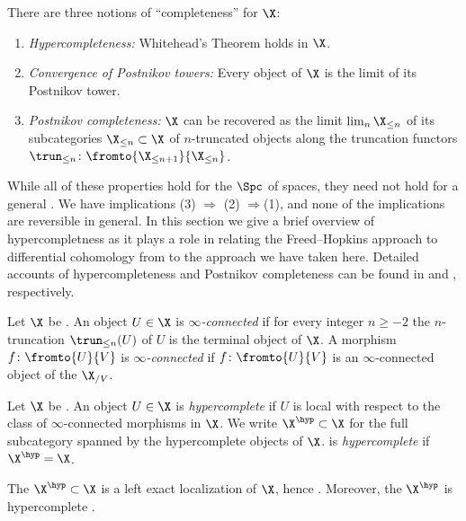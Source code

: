 There are three notions of ``completeness'' for \atopos $ \X $:
\begin{enumerate}[(1)]
	\item \textit{Hypercompleteness:} Whitehead's Theorem holds in $ \X $.

	\item \textit{Convergence of Postnikov towers:} Every object of $ \X $ is the limit of its Postnikov tower.

	\item \textit{Postnikov completeness:} $ \X $ can be recovered as the limit $ \lim_{n} \X_{\leq n} $ of its subcategories $ \X_{\leq n} \subset \X $ of $ n $-truncated objects along the truncation functors $ \trun_{\leq n} \colon \fromto{\X_{\leq n+1}}{\X_{\leq n}} $.
\end{enumerate}
While all of these properties hold for the \topos $ \Spc $ of spaces, they need not hold for a general \topos.
We have implications (3) $ \Rightarrow $ (2) $ \Rightarrow $(1), and none of the implications are reversible in general.
In this section we give a brief overview of hypercompletness as it plays a role in relating the Freed--Hopkins approach to differential cohomology from \cite{MR3049871} to the \categorical approach we have taken here.
Detailed accounts of hypercompleteness and Postnikov completeness can be found in \cite[]{HTT} and \cite[]{SAG}, respectively.

\begin{definition}
	Let $ \X $ be \atopos.
	An object $ U \in \X $ is \textit{$ \infty $-connected} if for every integer $ n \geq -2 $ the $ n $-truncation $ \trun_{\leq n}(U) $ of $ U $ is the terminal object of $ \X $.
	A morphism $ f \colon \fromto{U}{V} $ is \textit{$ \infty $-connected} if $ f \colon \fromto{U}{V} $ is an $ \infty $-connected object of the \topos $ \X_{/V} $.
\end{definition}

\begin{definition}\label{def:hypercompleteness}
	Let $ \X $ be \atopos.
	An object $ U \in \X $ is \textit{hypercomplete} if $ U $ is local with respect to the class of $ \infty $-connected morphisms in $ \X $.
	We write $ \X^{\hyp} \subset \X $ for the full subcategory spanned by the hypercomplete objects of $ \X $.
	\Atopos is \textit{hypercomplete} if $ \X^{\hyp} = \X $.
\end{definition}

\begin{nul}
	The \category $ \X^{\hyp} \subset \X $ is a left exact localization of $ \X $, hence \atopos \cite[]{HTT}.
	Moreover, the \topos $ \X^{\hyp} $ is hypercomplete .
\end{nul}


